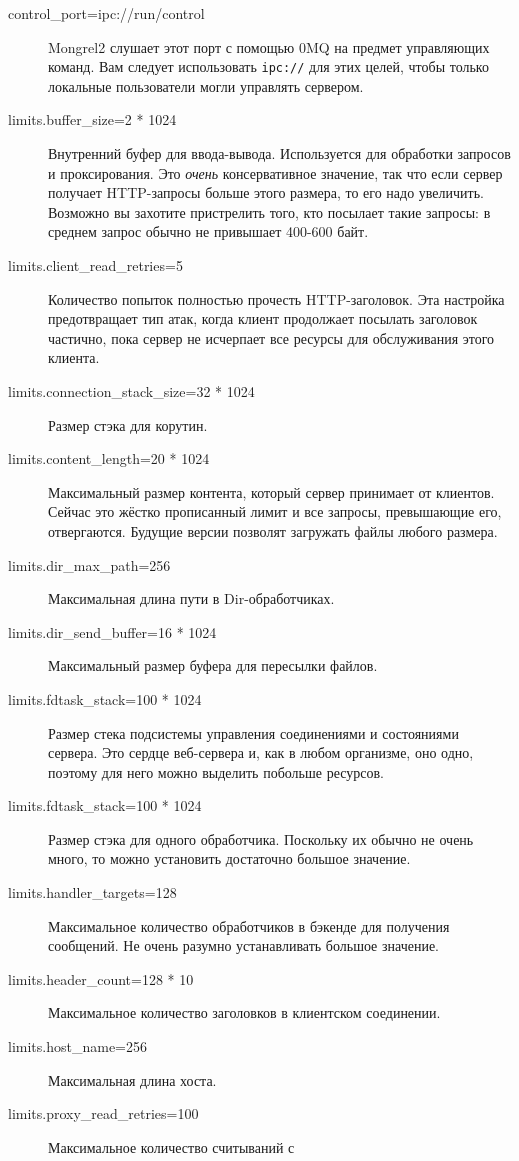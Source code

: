 \begin{description}
\item[control\_port=ipc://run/control] Mongrel2 слушает этот порт с
помощью 0MQ на предмет управляющих команд. Вам следует использовать
\verb|ipc://| для этих целей, чтобы только локальные пользователи
могли управлять сервером.
\item[limits.buffer\_size=2 * 1024] Внутренний буфер для ввода-вывода.
Используется для обработки запросов и проксирования. Это \emph{очень}
консервативное значение, так что если сервер получает HTTP-запросы
больше этого размера, то его надо увеличить. Возможно вы захотите
пристрелить того, кто посылает такие запросы: в среднем запрос обычно
не привышает 400-600 байт.
\item[limits.client\_read\_retries=5] Количество попыток полностью прочесть
HTTP-заголовок. Эта настройка предотвращает тип атак, когда клиент продолжает
посылать заголовок частично, пока сервер не исчерпает все ресурсы для
обслуживания этого клиента.
\item[limits.connection\_stack\_size=32 * 1024] Размер стэка для
корутин.
\item[limits.content\_length=20 * 1024] Максимальный размер контента,
который сервер принимает от клиентов. Сейчас это жёстко прописанный
лимит и все запросы, превышающие его, отвергаются. Будущие версии
позволят загружать файлы любого размера.
\item[limits.dir\_max\_path=256] Максимальная длина пути в
Dir-обработчиках.
\item[limits.dir\_send\_buffer=16 * 1024] Максимальный размер буфера
для пересылки файлов.
\item[limits.fdtask\_stack=100 * 1024] Размер стека подсистемы
управления соединениями и состояниями сервера. Это сердце веб-сервера
и, как в любом организме, оно одно, поэтому для него можно выделить
побольше ресурсов.
\item[limits.fdtask\_stack=100 * 1024] Размер стэка для одного
обработчика. Поскольку их обычно не очень много, то можно установить
достаточно большое значение. 
\item[limits.handler\_targets=128] Максимальное количество
обработчиков в бэкенде для получения сообщений. Не очень разумно
устанавливать большое значение.
\item[limits.header\_count=128 * 10] Максимальное количество
заголовков в клиентском соединении.
\item[limits.host\_name=256] Максимальная длина хоста.
\item[limits.proxy\_read\_retries=100] Максимальное количество считываний с

\end{description}
